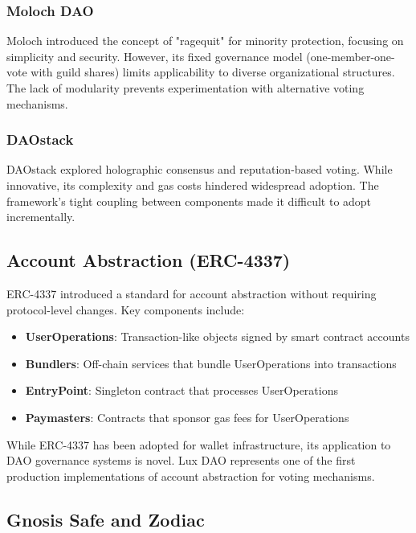 \documentclass[11pt,a4paper]{article}
\begin{document}
\subsubsection{Moloch DAO}

Moloch \cite{moloch} introduced the concept of "ragequit" for minority protection, focusing on simplicity and security. However, its fixed governance model (one-member-one-vote with guild shares) limits applicability to diverse organizational structures. The lack of modularity prevents experimentation with alternative voting mechanisms.

\subsubsection{DAOstack}

DAOstack \cite{daostack} explored holographic consensus and reputation-based voting. While innovative, its complexity and gas costs hindered widespread adoption. The framework's tight coupling between components made it difficult to adopt incrementally.

\subsection{Account Abstraction (ERC-4337)}

ERC-4337 \cite{erc4337} introduced a standard for account abstraction without requiring protocol-level changes. Key components include:

\begin{itemize}
    \item \textbf{UserOperations}: Transaction-like objects signed by smart contract accounts
    \item \textbf{Bundlers}: Off-chain services that bundle UserOperations into transactions
    \item \textbf{EntryPoint}: Singleton contract that processes UserOperations
    \item \textbf{Paymasters}: Contracts that sponsor gas fees for UserOperations
\end{itemize}

While ERC-4337 has been adopted for wallet infrastructure, its application to DAO governance systems is novel. Lux DAO represents one of the first production implementations of account abstraction for voting mechanisms.

\subsection{Gnosis Safe and Zodiac}
\end{document}
